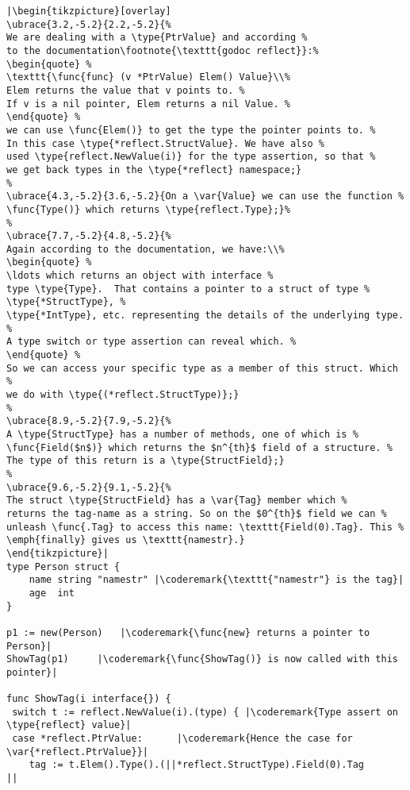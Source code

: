 \begin{lstlisting}[caption=Introspection using reflection,label=src:introspection]
|\begin{tikzpicture}[overlay]
\ubrace{3.2,-5.2}{2.2,-5.2}{%
We are dealing with a \type{PtrValue} and according %
to the documentation\footnote{\texttt{godoc reflect}}:%
\begin{quote} %
\texttt{\func{func} (v *PtrValue) Elem() Value}\\%
Elem returns the value that v points to. %
If v is a nil pointer, Elem returns a nil Value. %
\end{quote} %
we can use \func{Elem()} to get the type the pointer points to. %
In this case \type{*reflect.StructValue}. We have also %
used \type{reflect.NewValue(i)} for the type assertion, so that %
we get back types in the \type{*reflect} namespace;}
%
\ubrace{4.3,-5.2}{3.6,-5.2}{On a \var{Value} we can use the function %
\func{Type()} which returns \type{reflect.Type};}%
%
\ubrace{7.7,-5.2}{4.8,-5.2}{%
Again according to the documentation, we have:\\%
\begin{quote} %
\ldots which returns an object with interface %
type \type{Type}.  That contains a pointer to a struct of type %
\type{*StructType}, %
\type{*IntType}, etc. representing the details of the underlying type. %
A type switch or type assertion can reveal which. %
\end{quote} %
So we can access your specific type as a member of this struct. Which %
we do with \type{(*reflect.StructType)};}
%
\ubrace{8.9,-5.2}{7.9,-5.2}{%
A \type{StructType} has a number of methods, one of which is %
\func{Field($n$)} which returns the $n^{th}$ field of a structure. %
The type of this return is a \type{StructField};}
%
\ubrace{9.6,-5.2}{9.1,-5.2}{%
The struct \type{StructField} has a \var{Tag} member which %
returns the tag-name as a string. So on the $0^{th}$ field we can %
unleash \func{.Tag} to access this name: \texttt{Field(0).Tag}. This %
\emph{finally} gives us \texttt{namestr}.}
\end{tikzpicture}|
type Person struct {
    name string "namestr" |\coderemark{\texttt{"namestr"} is the tag}|
    age  int
}

p1 := new(Person)   |\coderemark{\func{new} returns a pointer to Person}|
ShowTag(p1)	    |\coderemark{\func{ShowTag()} is now called with this pointer}|

func ShowTag(i interface{}) {
 switch t := reflect.NewValue(i).(type) { |\coderemark{Type assert on \type{reflect} value}|
 case *reflect.PtrValue:	  |\coderemark{Hence the case for \var{*reflect.PtrValue}}|
	tag := t.Elem().Type().(||*reflect.StructType).Field(0).Tag
||
\end{lstlisting}
